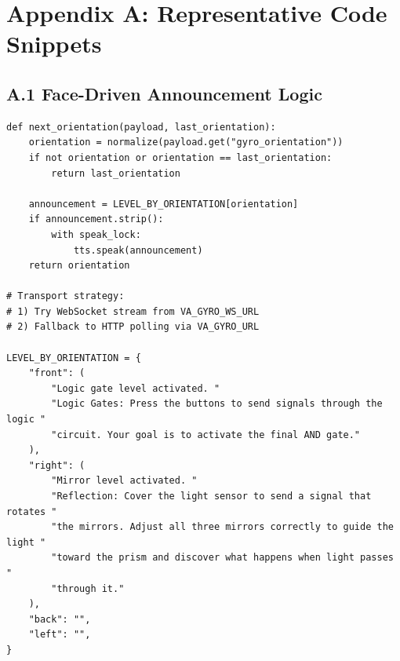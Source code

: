 \documentclass[12pt,a4paper]{article}
\begin{document}
\section*{Appendix A: Representative Code Snippets}

\subsection*{A.1 Face-Driven Announcement Logic}
\begin{lstlisting}[style=pythonstyle]
def next_orientation(payload, last_orientation):
    orientation = normalize(payload.get("gyro_orientation"))
    if not orientation or orientation == last_orientation:
        return last_orientation

    announcement = LEVEL_BY_ORIENTATION[orientation]
    if announcement.strip():
        with speak_lock:
            tts.speak(announcement)
    return orientation

# Transport strategy:
# 1) Try WebSocket stream from VA_GYRO_WS_URL
# 2) Fallback to HTTP polling via VA_GYRO_URL

LEVEL_BY_ORIENTATION = {
    "front": (
        "Logic gate level activated. "
        "Logic Gates: Press the buttons to send signals through the logic "
        "circuit. Your goal is to activate the final AND gate."
    ),
    "right": (
        "Mirror level activated. "
        "Reflection: Cover the light sensor to send a signal that rotates "
        "the mirrors. Adjust all three mirrors correctly to guide the light "
        "toward the prism and discover what happens when light passes "
        "through it."
    ),
    "back": "",
    "left": "",
}
\end{lstlisting}
\end{document}
